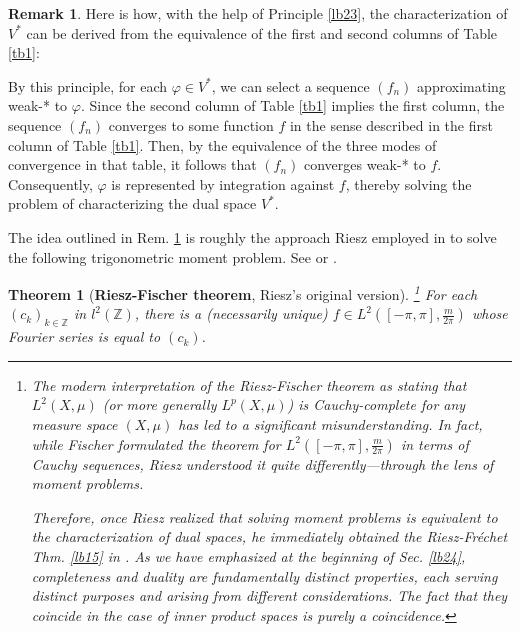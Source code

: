 \documentclass[12pt,b5paper,notitlepage]{article}
\theoremstyle{definition}
\newtheorem{rem}[df]{Remark}
\theoremstyle{plain}
\newtheorem{thm}[df]{Theorem}
\newcommand{\Zbb}{\mathbb Z}
\newcommand{\hqed}{\hfill\qedsymbol}
\numberwithin{equation}{section}
\begin{document}
\begin{rem}\label{lb110}
Here is how, with the help of Principle \ref{lb23}, the characterization of $V^*$ can be derived from the equivalence of the first and second columns of Table \ref{tb1}: 

By this principle, for each $\varphi\in V^*$, we can select a sequence $(f_n)$  approximating weak-* to $\varphi$. Since the second column of Table \ref{tb1} implies the first column, the sequence $(f_n)$ converges to some function $f$ in the sense described in the first column of Table \ref{tb1}. Then, by the equivalence of the three modes of convergence in that table, it follows that $(f_n)$ converges weak-* to $f$. Consequently, $\varphi$ is represented by integration against $f$, thereby solving the problem of characterizing the dual space $V^*$. \hqed
\end{rem}

The idea outlined in Rem. \ref{lb110} is roughly the approach Riesz employed in \cite{Rie07a} to solve the following trigonometric moment problem. See \cite[Ch. 6]{Haw-L} or \cite{Rie07a}.

\begin{thm}[\textbf{Riesz-Fischer theorem}, Riesz's original version]\footnote{The modern interpretation of the Riesz-Fischer theorem as stating that $L^2(X,\mu)$ (or more generally $L^p(X,\mu)$) is Cauchy-complete for any measure space $(X,\mu)$ has led to a significant misunderstanding. In fact, while Fischer formulated the theorem for $L^2([-\pi,\pi],\frac m{2\pi})$ in terms of Cauchy sequences, Riesz understood it quite differently---through the lens of moment problems.

Therefore, once Riesz realized that solving moment problems is equivalent to the characterization of dual spaces, he immediately obtained the Riesz-Fr\'echet Thm. \ref{lb15} in \cite{Rie07b}. As we have emphasized at the beginning of Sec. \ref{lb24}, completeness and duality are fundamentally distinct properties, each serving distinct purposes and arising from different considerations. The fact that they coincide in the case of inner product spaces is purely a coincidence.}
For each $(c_k)_{k\in\Zbb}$ in $l^2(\Zbb)$, there is a (necessarily unique) $f\in L^2([-\pi,\pi],\frac m{2\pi})$ whose Fourier series is equal to $(c_k)$.
\end{thm}
\end{document}
